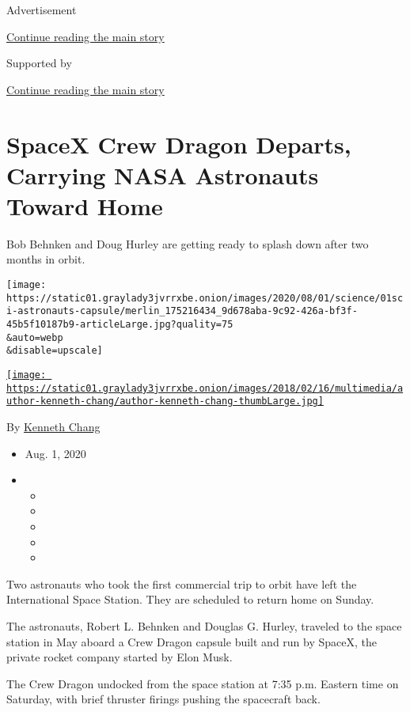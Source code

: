 Advertisement

\protect\hyperlink{after-top}{Continue reading the main story}

Supported by

\protect\hyperlink{after-sponsor}{Continue reading the main story}

\hypertarget{spacex-crew-dragon-departs-carrying-nasa-astronauts-toward-home}{%
\section{SpaceX Crew Dragon Departs, Carrying NASA Astronauts Toward
Home}\label{spacex-crew-dragon-departs-carrying-nasa-astronauts-toward-home}}

Bob Behnken and Doug Hurley are getting ready to splash down after two
months in orbit.

\texttt{[image: https://static01.graylady3jvrrxbe.onion/images/2020/08/01/science/01sci-astronauts-capsule/merlin\_175216434\_9d678aba-9c92-426a-bf3f-45b5f10187b9-articleLarge.jpg?quality=75\\\&auto=webp\\\&disable=upscale]}

\href{https://www.nytimes3xbfgragh.onion/by/kenneth-chang}{\texttt{[image: https://static01.graylady3jvrrxbe.onion/images/2018/02/16/multimedia/author-kenneth-chang/author-kenneth-chang-thumbLarge.jpg]}}

By \href{https://www.nytimes3xbfgragh.onion/by/kenneth-chang}{Kenneth
Chang}

\begin{itemize}
\item
  Aug. 1, 2020
\item
  \begin{itemize}
  \item
  \item
  \item
  \item
  \item
  \end{itemize}
\end{itemize}

Two astronauts who took the first commercial trip to orbit have left the
International Space Station. They are scheduled to return home on
Sunday.

The astronauts, Robert L. Behnken and Douglas G. Hurley, traveled to the
space station in May aboard a Crew Dragon capsule built and run by
SpaceX, the private rocket company started by Elon Musk.

The Crew Dragon undocked from the space station at 7:35 p.m. Eastern
time on Saturday, with brief thruster firings pushing the spacecraft
back.

